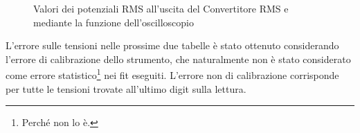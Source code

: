 \documentclass[a4paper,10pt]{article}
\begin{document}
\begin{table}[H]
	\centering
	
	\caption{Dati acquisiti per la risposta in frequenza della seconda parte del preamplificatore.}
	\label{tab:postpreamp}
\end{table}

\begin{figure}
	\begin{minipage}{0.64\textwidth}
		\begin{table}[H]
			\centering
			
			\caption{Dati acquisiti per la risposta in frequenza del passabanda.}
			\label{tab:bandpass}
		\end{table}
	\end{minipage}
	\begin{minipage}{0.34\textwidth}
		\begin{table}[H]
			\centering
			
			\caption{Valori dei potenziali RMS all'uscita del Convertitore RMS e mediante la funzione dell'oscilloscopio}
			\label{tab:RMScal}
		\end{table}
	\end{minipage}
\end{figure}

\begin{table}[H]
	\centering
	
	\caption{Valori delle frequenze utilizzate e del potenziale in uscita al circuito utilizzando un partitore 1000:1.}
	\label{tab:totamp}
\end{table}

\pagebreak

L'errore sulle tensioni nelle prossime due tabelle è stato ottenuto considerando l'errore di calibrazione dello strumento, che naturalmente non è stato considerato come errore statistico\footnote{Perché non lo è.} nei fit eseguiti.
L'errore non di calibrazione corrisponde per tutte le tensioni trovate all'ultimo digit sulla lettura.

\begin{table}[H]
	\centering
	
	\caption{Valori delle resistenze utilizzate e del potenziale all'uscita del circuito.}
	\label{tab:lastfit}
\end{table}

\begin{table}[H]
	\centering
	
	\caption{Valori delle resistenze utilizzate e del potenziale all'uscita del circuito.}
	\label{tab:lastfit1}
\end{table}
\end{document}
